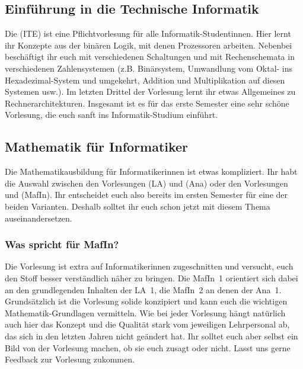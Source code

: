 \subsection{Einführung in die Technische Informatik}
\vspace{-1mm}
\label{info2}
Die  (\gls{ITE}) ist eine Pflichtvorlesung für alle Informatik-Studentinnen. Hier lernt ihr Konzepte aus der binären Logik, mit denen Prozessoren arbeiten. Nebenbei beschäftigt ihr euch mit verschiedenen Schaltungen und mit Rechenschemata in verschiedenen Zahlensystemen (z.B. Binärsystem, Umwandlung vom Oktal- ins Hexadezimal-System und umgekehrt, Addition und Multiplikation auf diesen Systemen usw.). Im letzten Drittel der Vorlesung lernt ihr etwas Allgemeines zu Rechnerarchitekturen. Insgesamt ist es für das erste Semester eine sehr schöne Vorlesung, die euch sanft ins Informatik-Studium einführt.


\subsection{Mathematik für Informatiker}
\label{mafin}
Die Mathematikausbildung für Informatikerinnen ist etwas kompliziert. Ihr habt die Auswahl zwischen den Vorlesungen  (\gls{LA}) und  (\gls{Ana}) oder den Vorlesungen  und  (\gls{MafIn}). Ihr entscheidet euch also bereits im ersten Semester für eine der beiden Varianten. Deshalb solltet ihr euch schon jetzt mit diesem Thema auseinandersetzen.

\subsubsection{Was spricht für MafIn?}
Die Vorlesung ist extra auf Informatikerinnen zugeschnitten und versucht, euch den Stoff besser verständlich näher zu bringen. Die \gls{MafIn}~1 orientiert sich dabei an den grundlegenden Inhalten der \gls{LA}~1, die \gls{MafIn}~2 an denen der \gls{Ana}~1. Grundsätzlich ist die Vorlesung solide konzipiert und kann euch die wichtigen Mathematik-Grundlagen vermitteln. Wie bei jeder Vorlesung hängt natürlich auch hier das Konzept und die Qualität stark vom jeweiligen Lehrpersonal ab, das sich in den letzten Jahren nicht geändert hat. Ihr solltet euch aber selbst ein Bild von der Vorlesung machen, ob sie euch zusagt oder nicht. Lasst uns gerne Feedback zur Vorlesung zukommen.

